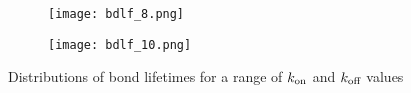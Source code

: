 \documentclass{article}
\newcommand{\tn}{\textnormal}
\begin{document}
\begin{figure}[h]
  \centering
  \begin{subfigure}{0.49\textwidth}
    \texttt{[image: bdlf\_8.png]}
  \end{subfigure}
  \hfill
  \begin{subfigure}{0.49\textwidth}
    \texttt{[image: bdlf\_10.png]}
  \end{subfigure}
  \caption{Distributions of bond lifetimes for a range of $k_\tn{on}$
    and $k_\tn{off}$ values}
  \label{fig:bdlf}
\end{figure}

% 
% 
\end{document}
